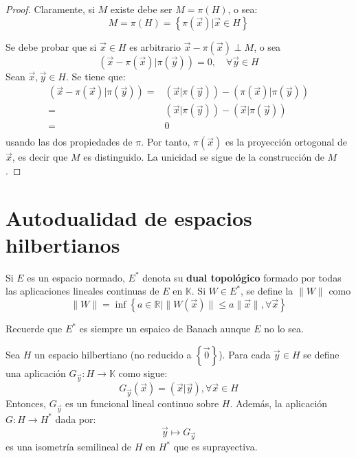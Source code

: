 \documentclass[12pt]{report}
\newcounter{it}
\theoremstyle{largebreak}
\newcommand\cf[3]{\ensuremath{#1:#2\rightarrow#3}}
\newcommand\norm[1]{\ensuremath{\|#1\|}}
\newcommand\pint[2]{\ensuremath{\left(#1\big| #2\right)}}
\begin{document}
    \begin{proof}
        Claramente, si $M$ existe debe ser $M=\pi(H)$, o sea:
        \begin{equation*}
            M=\pi(H)=\left\{\pi(\vec{x})\big| \vec{x}\in H \right\}
        \end{equation*}
        
        Se debe probar que si $\vec{x}\in H$ es arbitrario $\vec{x}-\pi(\vec{x})\perp M$, o sea
        \begin{equation*}
            \pint{\vec{x}-\pi(\vec{x})}{\pi(\vec{y})}=0,\quad\forall\vec{y}\in H
        \end{equation*}
        Sean $\vec{x},\vec{y}\in H$. Se tiene que:
        \begin{equation*}
            \begin{split}
                \pint{\vec{x}-\pi(\vec{x})}{\pi(\vec{y})}=&\pint{\vec{x}}{\pi(\vec{y})}-\pint{\pi(\vec{x})}{\pi(\vec{y})} \\
                =&\pint{\vec{x}}{\pi(\vec{y})}-\pint{\vec{x}}{\pi(\vec{y})} \\
                =&0\\
            \end{split}
        \end{equation*}
        usando las dos propiedades de $\pi$. Por tanto, $\pi(\vec{x})$ es la proyección ortogonal de $\vec{x}$, es decir que $M$ es distinguido. La unicidad se sigue de la construcción de $M$.
    \end{proof}

    \section{Autodualidad de espacios hilbertianos}

    Si $E$ es un espacio normado, $E^*$ denota su \textbf{dual topológico} formado por todas las aplicaciones lineales continuas de $E$ en $\mathbb{K}$. Si $W\in E^*$, se define la $\norm{W}$ como
    \begin{equation*}
        \norm{W}=\inf\left\{a\in\mathbb{R}\big| \norm{W(\vec{x})}\leq a\norm{\vec{x}},\forall\vec{x} \right\}
    \end{equation*}
    
    Recuerde que $E^*$ es siempre un espaico de Banach aunque $E$ no lo sea.

    \begin{theor}
        Sea $H$ un espacio hilbertiano (no reducido a $\left\{\vec{0} \right\}$). Para cada $\vec{y}\in H$ se define una aplicación $\cf{G_{\vec{y}}}{H}{\mathbb{K}}$ como sigue:
        \begin{equation*}
            G_{\vec{y}}(\vec{x})=\pint{\vec{x}}{\vec{y}},\forall\vec{x}\in H
        \end{equation*}
        Entonces, $G_{\vec{y}}$ es un funcional lineal continuo sobre $H$. Además, la aplicación $\cf{G}{H}{H^*}$ dada por:
        \begin{equation*}
            \vec{y}\mapsto G_{\vec{y}}
        \end{equation*}
         es una isometría semilineal de $H$ en $H^*$ que es suprayectiva.
    \end{theor}
\end{document}

